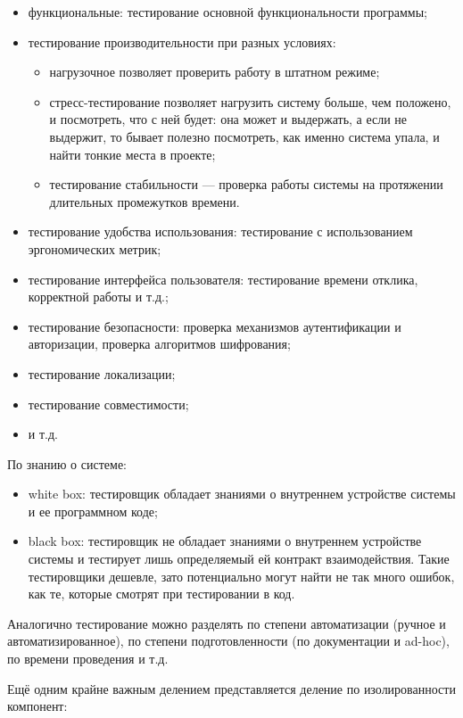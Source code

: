 \documentclass{../../text-style}
\begin{document}
\begin{itemize}
    \item функциональные: тестирование основной функциональности программы;
    \item тестирование производительности при разных условиях:
    \begin{itemize}
        \item нагрузочное позволяет проверить работу в штатном режиме;
        \item стресс-тестирование позволяет нагрузить систему больше, чем положено, и посмотреть, что с ней будет: она может и выдержать, а если не выдержит, то бывает полезно посмотреть, как именно система упала, и найти тонкие места в проекте;
        \item тестирование стабильности --- проверка работы системы на протяжении длительных промежутков времени.
    \end{itemize}
    \item тестирование удобства использования: тестирование с использованием эргономических метрик;
    \item тестирование интерфейса пользователя: тестирование времени отклика, корректной работы и т.д.;
    \item тестирование безопасности: проверка механизмов аутентификации и авторизации, проверка алгоритмов шифрования;
    \item тестирование локализации;
    \item тестирование совместимости;
    \item и т.д.
\end{itemize}

По знанию о системе:

\begin{itemize}
    \item white box: тестировщик обладает знаниями о внутреннем устройстве системы и ее программном коде;
    \item black box: тестировщик не обладает знаниями о внутреннем устройстве системы и тестирует лишь определяемый ей контракт взаимодействия. Такие тестировщики дешевле, зато потенциально могут найти не так много ошибок, как те, которые смотрят при тестировании в код.
\end{itemize}

Аналогично тестирование можно разделять по степени автоматизации (ручное и автоматизированное), по степени подготовленности (по документации и ad-hoc), по времени проведения и т.д.

Ещё одним крайне важным делением представляется деление по изолированности компонент:
\end{document}
